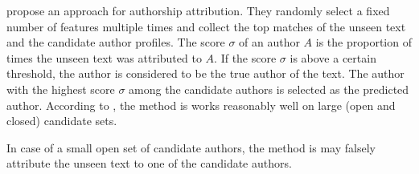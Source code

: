 \citet{koppel_authorship_2011} propose an approach for authorship attribution.
They randomly select a fixed number of features multiple times and collect the top matches of the unseen text and the candidate author profiles.
The score $\sigma$ of an author $A$ is the proportion of times the unseen text was attributed to $A$.
If the score $\sigma$ is above a certain threshold, the author is considered to be the true author of the text.
The author with the highest score $\sigma$ among the candidate authors is selected as the predicted author.
According to \citet{koppel_authorship_2011}, the method is works reasonably well on large (open and closed) candidate sets.

In case of a small open set of candidate authors, the method is may falsely attribute the unseen text to one of the candidate authors.